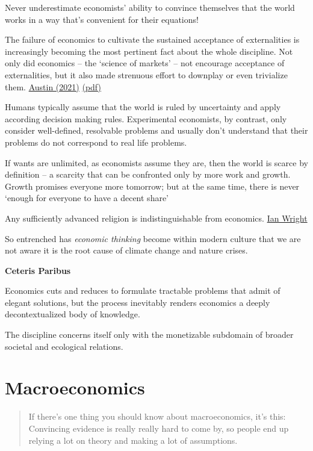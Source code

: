 \documentclass[
]{book}
\begin{document}
Never underestimate economists' ability to convince themselves that the world works in a way that's convenient for their equations!

The failure of economics to cultivate the sustained acceptance of externalities is increasingly
becoming the most pertinent fact about the whole discipline. Not only did economics -- the `science
of markets' -- not encourage acceptance of externalities, but it also made strenuous effort to
downplay or even trivialize them.
\href{https://bothbrainsrequire\%20d.com/2021/10/25/fix-that-fails/}{Austin (2021)}
\href{pdf/Austin_2021_Market_Led_Sustainability_Fix_Fails.pdf}{(pdf)}

Humans typically assume that the world is ruled by uncertainty and apply according decision making rules. Experimental economists, by contrast, only consider well-defined, resolvable problems and usually don't understand that their problems do not correspond to real life problems.

If wants are unlimited, as economists assume they are, then the world is scarce by definition -- a scarcity that can be confronted only by more work and growth. Growth promises everyone more tomorrow; but at the same time, there is never `enough for everyone to have a decent share'

Any sufficiently advanced religion is indistinguishable from economics.
\href{https://ianwrightsite.wordpress.com/2021/11/25/dark-eucharist-of-the-real-god/}{Ian Wright}

So entrenched has \emph{economic thinking} become within modern culture that we are not aware it is the root cause of climate change and nature crises.

\textbf{Ceteris Paribus}

Economics cuts and reduces to formulate tractable problems that admit of elegant solutions, but the process inevitably renders economics a deeply decontextualized body of knowledge.

The discipline concerns itself only with the monetizable subdomain of broader societal and ecological relations.

\hypertarget{macroeconomics}{%
\section{Macroeconomics}\label{macroeconomics}}

\begin{quote}
If there's one thing you should know about macroeconomics, it's this:
Convincing evidence is really really hard to come by,
so people end up relying a lot on theory and
making a lot of assumptions.
\end{quote}
\end{document}
